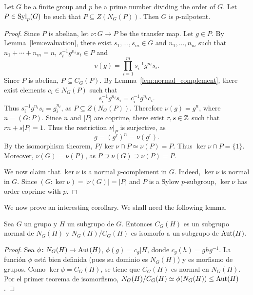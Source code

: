 \begin{theorem}[Burnside]
	\label{thm:Burnside:normal_complement}
	Let $G$ be a finite group and $p$ be a prime number dividing the order of $G$. Let
	$P\in\mathrm{Syl}_p(G)$ be such that $P\subseteq Z(N_G(P))$. Then $G$ is
	$p$-nilpotent.
\end{theorem}

\begin{proof}
	Since $P$ is abelian, let $\nu\colon G\to P$ be the transfer map. 
	Let $g\in P$.  By Lemma~\ref{lem:evaluation}, there exist $s_1,\dots,s_m\in
	G$ and $n_1,\dots,n_m$ such that $n_1+\cdots+n_m=n$,
	$s_i^{-1}g^{n_i}s_i\in P$ and  
	\[
		v(g)=\prod_{i=1}^m s_i^{-1}g^{n_i}s_i.
	\]
	Since $P$ is abelian, $P\subseteq C_G(P)$. By Lemma~\ref{lem:normal_complement}, 
	there exist elements $c_i\in N_G(P)$ such that 
	\[
	s_i^{-1}g^{n_i}s_i=c_i^{-1}g^{n_i}c_i.
	\]
	Thus $s_i^{-1}g^{n_i}s_i=g_i^{n_i}$, as $P\subseteq Z(N_G(P))$. Therefore 
	$\nu(g)=g^n$, where $n=(G:P)$. Since $n$ and $|P|$ are coprime, 
	there exist $r,s\in\mathbb{Z}$ such that $rn+s|P|=1$. Thus the restriction 
	$\nu|_P$ is surjective, as 
	\[
	g=(g^r)^n=\nu(g^r).
	\]
	By the isomorphism theorem, $P/\ker\nu\cap P\simeq\nu(P)=P$. 
	Thus $\ker\nu\cap P=\{1\}$. Moreover, $\nu(G)=\nu(P)$, as  
	$P\supseteq \nu(G)\supseteq \nu(P)=P$.
	
	We now claim that $\ker\nu$ is a normal $p$-complement in $G$. Indeed, $\ker\nu$ is normal in $G$. 
	Since $(G:\ker\nu)=|\nu(G)|=|P|$ and $P$ is a Sylow $p$-subgroup, 
	$\ker\nu$ has order coprime with $p$.
\end{proof}


We now prove an interesting corollary. We shall need the following lemma. 

\begin{lemma}
	\label{lem:NC}
	Sea $G$ un grupo y $H$ un subgrupo de $G$. Entonces $C_G(H)$ es un subgrupo
	normal de $N_G(H)$ y $N_G(H)/C_G(H)$ es isomorfo a un subgrupo de
	$\operatorname{Aut}(H)$.
\end{lemma}

\begin{proof}
	Sea $\phi\colon N_G(H)\to\operatorname{Aut}(H)$,  $\phi(g)=c_g|H$, donde
	$c_g(h)=ghg^{-1}$.  La función $\phi$ está bien definida (pues su dominio
	es $N_G(H)$) y es morfismo de grupos. Como $\ker\phi=C_G(H)$, se tiene que
	$C_G(H)$ es normal en $N_G(H)$. Por el primer teorema de isomorfismo,
	$N_G(H)/C_G(H)\simeq\phi(N_G(H))\leq\operatorname{Aut}(H)$.
\end{proof}

